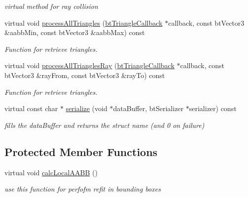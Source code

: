 \begin{CompactItemize}
\begin{CompactList}\small\item\em virtual method for ray collision \item\end{CompactList}\item 
virtual void \hyperlink{classbt_g_impact_mesh_shape_0b3a0f7b06feb5e2e1fa94f2b5fcd4c7}{processAllTriangles} (\hyperlink{classbt_triangle_callback}{btTriangleCallback} $\ast$callback, const btVector3 \&aabbMin, const btVector3 \&aabbMax) const 
\begin{CompactList}\small\item\em Function for retrieve triangles. \item\end{CompactList}\item 
virtual void \hyperlink{classbt_g_impact_mesh_shape_80b60d4ca87b2739b2389258e901900d}{processAllTrianglesRay} (\hyperlink{classbt_triangle_callback}{btTriangleCallback} $\ast$callback, const btVector3 \&rayFrom, const btVector3 \&rayTo) const 
\begin{CompactList}\small\item\em Function for retrieve triangles. \item\end{CompactList}\item 
\hypertarget{classbt_g_impact_mesh_shape_52fb7b4c6cbb81e7041e88b04cd3e89c}{
virtual const char $\ast$ \hyperlink{classbt_g_impact_mesh_shape_52fb7b4c6cbb81e7041e88b04cd3e89c}{serialize} (void $\ast$dataBuffer, btSerializer $\ast$serializer) const }
\label{classbt_g_impact_mesh_shape_52fb7b4c6cbb81e7041e88b04cd3e89c}

\begin{CompactList}\small\item\em fills the dataBuffer and returns the struct name (and 0 on failure) \item\end{CompactList}\end{CompactItemize}
\subsection*{Protected Member Functions}
\begin{CompactItemize}
\item 
\hypertarget{classbt_g_impact_mesh_shape_a9273d609f4872c7a4c05e9873edbda8}{
virtual void \hyperlink{classbt_g_impact_mesh_shape_a9273d609f4872c7a4c05e9873edbda8}{calcLocalAABB} ()}
\label{classbt_g_impact_mesh_shape_a9273d609f4872c7a4c05e9873edbda8}

\begin{CompactList}\small\item\em use this function for perfofm refit in bounding boxes \item\end{CompactList}\end{CompactItemize}


